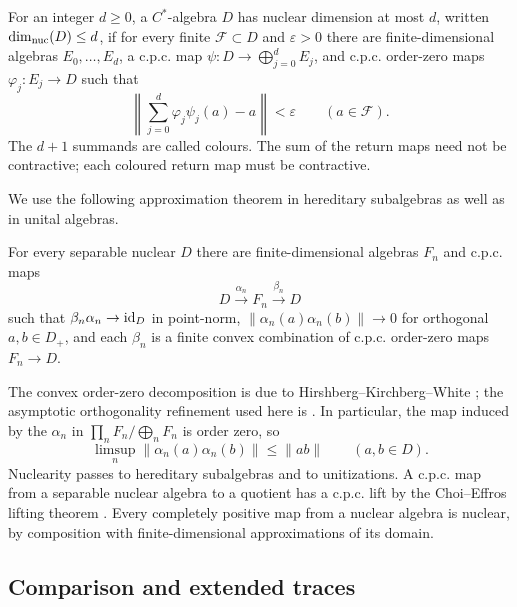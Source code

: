 \begin{definition}
\label{prelim:nuclear-dimension}
For an integer $d\ge0$, a $C^*$-algebra $D$ has nuclear dimension at
most $d$, written $\dim_{\mathrm{nuc}}(D)\le d$, if for every finite
$\mathcal F\subset D$ and $\varepsilon>0$ there are finite-dimensional
algebras $E_0,\ldots,E_d$, a c.p.c. map
$\psi:D\to\bigoplus_{j=0}^dE_j$, and c.p.c. order-zero maps
$\varphi_j:E_j\to D$ such that
\[
 \left\|\sum_{j=0}^d\varphi_j\psi_j(a)-a\right\|<\varepsilon
 \qquad(a\in\mathcal F).
\]
The $d+1$ summands are called colours.  The sum of the return maps
need not be contractive; each coloured return map must be contractive.
\end{definition}

We use the following approximation theorem in hereditary subalgebras as
well as in unital algebras.

\begin{theorem}
\label{prelim:bcw}
For every separable nuclear $D$ there are finite-dimensional algebras
$F_n$ and c.p.c. maps
\[
 D\xrightarrow{\alpha_n}F_n\xrightarrow{\beta_n}D
\]
such that $\beta_n\alpha_n\to\mathrm{id}_D$ in point-norm,
$\|\alpha_n(a)\alpha_n(b)\|\to0$ for orthogonal $a,b\in D_+$, and
each $\beta_n$ is a finite convex combination of c.p.c. order-zero maps
$F_n\to D$.
\end{theorem}

The convex order-zero decomposition is due to
Hirshberg--Kirchberg--White \cite[Theorem~1.4]{HKW}; the asymptotic
orthogonality refinement used here is \cite[Theorem~3.1]{BCW}.
In particular, the map induced by the
$\alpha_n$ in $\prod_nF_n/\bigoplus_nF_n$ is order zero, so
\begin{equation}
 \label{prelim:asymptotic-product}
 \limsup_n\|\alpha_n(a)\alpha_n(b)\|\le\|ab\|
 \qquad(a,b\in D).
\end{equation}
Nuclearity passes to hereditary subalgebras and
to unitizations.  A c.p.c. map from a separable nuclear algebra to a
quotient has a c.p.c. lift by the Choi--Effros lifting theorem
\cite[Theorem~3.10]{ChoiEffros}.  Every completely positive map from a nuclear algebra is
nuclear, by composition with finite-dimensional approximations of its
domain.

\subsection{Comparison and extended traces}

